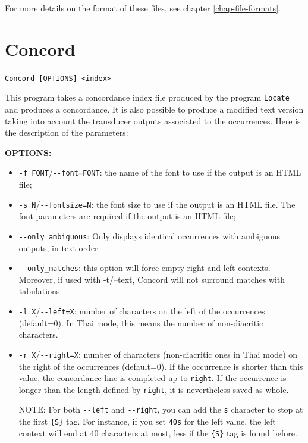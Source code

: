 \bigskip
\noindent For more details on the format of these files, see chapter
\ref{chap-file-formats}.






\section{Concord}
\label{section-Concord}
\verb+Concord [OPTIONS] <index>+

\bigskip
\noindent This program takes a concordance index file produced by the program
\verb+Locate+ and produces a concordance. It is also possible to produce a
modified text version taking into account the transducer outputs associated to
the occurrences. Here is the description of the parameters:

\bigskip
\noindent \textbf{OPTIONS:}
\begin{itemize}
  \item \verb+-f FONT+/\verb+--font=FONT+: the name of the font to use if the
  output is an HTML file;
  \item \verb+-s N+/\verb+--fontsize=N+: the font size to use if the output is
  an HTML file. The font parameters are required if the output is an HTML file;
  \item \verb+--only_ambiguous+: Only displays identical occurrences with 
  ambiguous outputs, in text order.
  \item \verb+--only_matches+: this option will force empty right and left contexts.
  Moreover, if used with -t/--text, Concord will not surround matches with tabulations
  \item \verb+-l X+/\verb+--left=X+: number of characters on the left of the 
  occurrences (default=0). In Thai mode, this means the number of non-diacritic
  characters.
  \item \verb+-r X+/\verb+--right=X+: number of characters (non-diacritic ones in Thai mode) on
  the right of the occurrences (default=0). If the occurrence is shorter than
  this value, the concordance line is completed up to \verb+right+. If the occurrence is longer
  than the length defined by \verb+right+, it is nevertheless saved as whole.
  
  \bigskip
  NOTE: For both \verb+--left+ and \verb+--right+, you can add the \verb+s+
  character to stop at the first \verb+{S}+ tag. For instance, if you
  set \verb+40s+ for the left value, the left context will end at 40 characters
  at most, less if the \verb+{S}+ tag is found before.
\end{itemize}

